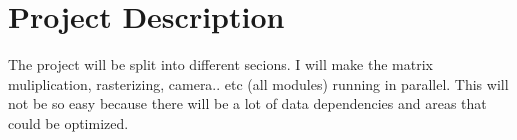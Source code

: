 \chapter*{Project Description}

The project will be split into different secions. I will make the matrix muliplication, rasterizing, camera.. etc (all modules) running in parallel. This will not be so easy because there will be a lot of data dependencies and areas that could be optimized. 
